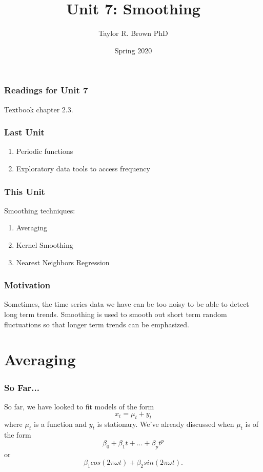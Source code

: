 \documentclass[%
xcolor=pdftex]{beamer}
\title{Unit 7: Smoothing}
\author[STAT 5170: Applied Time Series, Unit 6]{Taylor R. Brown PhD}
\institute{Department of Statistics, University of Virginia}
\date{Spring 2020}
\begin{document}
\frame{\titlepage}


\begin{frame}
\frametitle{Readings for Unit 7}

Textbook chapter 2.3.

\end{frame}


\begin{frame}
\frametitle{Last Unit}
\begin{enumerate}
\item Periodic functions
\item Exploratory data tools to access frequency
\end{enumerate}
\end{frame}

\begin{frame}
\frametitle{This Unit}
Smoothing techniques:
\begin{enumerate}
\item Averaging
\item Kernel Smoothing
\item Nearest Neighbors Regression
\end{enumerate}
\end{frame}

\begin{frame}
\frametitle{Motivation}

Sometimes, the time series data we have can be too noisy to be able to detect long term trends. Smoothing is used to smooth out short term random fluctuations so that longer term trends can be emphasized.

\end{frame}

\section{Averaging}
\frame{\tableofcontents[currentsection]}

\begin{frame}
\frametitle{So Far...}

So far, we have looked to fit models of the form
$$
x_t=\mu_t +y_t
$$
where $\mu_t$ is a function and $y_t$ is stationary.  We've already discussed when $\mu_t$ is of the form
$$
\beta_0+\beta_1 t+...+\beta_{p} t^p
$$
or
$$
\beta_1 cos(2 \pi \omega  t)+\beta_2 sin(2 \pi \omega  t).
$$


\end{frame}
\end{document}
